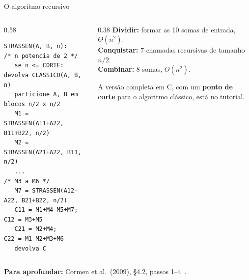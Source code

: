 \documentclass[aspectratio=169,xcolor=table]{beamer}
\newcommand{\fonte}[1]{%
  \vfill
  {\tiny\color{gray!55!black}\textbf{Para aprofundar:} #1\par}%
}
\begin{document}
\begin{frame}[fragile]{O algoritmo recursivo}
  \begin{columns}[T]
    \begin{column}{0.58\textwidth}
\begin{lstlisting}
STRASSEN(A, B, n):     /* n potencia de 2 */
   se n <= CORTE: devolva CLASSICO(A, B, n)
   particione A, B em blocos n/2 x n/2
   M1 = STRASSEN(A11+A22, B11+B22, n/2)
   M2 = STRASSEN(A21+A22, B11,     n/2)
   ...                        /* M3 a M6 */
   M7 = STRASSEN(A12-A22, B21+B22, n/2)
   C11 = M1+M4-M5+M7;   C12 = M3+M5
   C21 = M2+M4;         C22 = M1-M2+M3+M6
   devolva C
\end{lstlisting}
    \end{column}
    \begin{column}{0.38\textwidth}
      \scriptsize
      \textbf{Dividir:} formar as 10 somas de entrada, $\Theta(n^2)$.\\[2pt]
      \textbf{Conquistar:} 7 chamadas recursivas de tamanho $n/2$.\\[2pt]
      \textbf{Combinar:} 8 somas, $\Theta(n^2)$.
      \medskip

      A versão completa em C, com um \textbf{ponto de corte} para o algoritmo clássico,
      está no tutorial.
    \end{column}
  \end{columns}
  \fonte{Cormen et al.\ (2009), \S 4.2, passos 1--4~\cite{cormen2009introduction}.}
\end{frame}
\end{document}
